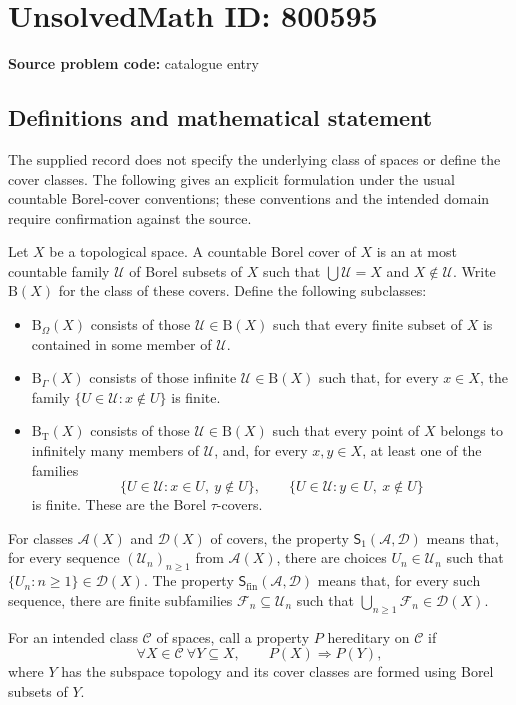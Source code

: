 \documentclass[11pt]{article}
\begin{document}
\section*{UnsolvedMath ID: 800595}
\textbf{Source problem code:} catalogue entry
\subsection{Definitions and mathematical statement}
The supplied record does not specify the underlying class of spaces or define the cover classes. The following gives an explicit formulation under the usual countable Borel-cover conventions; these conventions and the intended domain require confirmation against the source.

Let \(X\) be a topological space. A countable Borel cover of \(X\) is an at most countable family \(\mathcal U\) of Borel subsets of \(X\) such that \(\bigcup\mathcal U=X\) and \(X\notin\mathcal U\). Write \(\mathrm B(X)\) for the class of these covers. Define the following subclasses:
\begin{itemize}
\item \(\mathrm B_\Omega(X)\) consists of those \(\mathcal U\in\mathrm B(X)\) such that every finite subset of \(X\) is contained in some member of \(\mathcal U\).
\item \(\mathrm B_\Gamma(X)\) consists of those infinite \(\mathcal U\in\mathrm B(X)\) such that, for every \(x\in X\), the family \(\{U\in\mathcal U:x\notin U\}\) is finite.
\item \(\mathrm B_{\mathrm T}(X)\) consists of those \(\mathcal U\in\mathrm B(X)\) such that every point of \(X\) belongs to infinitely many members of \(\mathcal U\), and, for every \(x,y\in X\), at least one of the families
\[
\{U\in\mathcal U:x\in U,\ y\notin U\},\qquad
\{U\in\mathcal U:y\in U,\ x\notin U\}
\]
is finite. These are the Borel \(\tau\)-covers.
\end{itemize}
For classes \(\mathcal A(X)\) and \(\mathcal D(X)\) of covers, the property \(\mathsf S_1(\mathcal A,\mathcal D)\) means that, for every sequence \((\mathcal U_n)_{n\geq1}\) from \(\mathcal A(X)\), there are choices \(U_n\in\mathcal U_n\) such that \(\{U_n:n\geq1\}\in\mathcal D(X)\). The property \(\mathsf S_{\mathrm{fin}}(\mathcal A,\mathcal D)\) means that, for every such sequence, there are finite subfamilies \(\mathcal F_n\subseteq\mathcal U_n\) such that \(\bigcup_{n\geq1}\mathcal F_n\in\mathcal D(X)\).

For an intended class \(\mathcal C\) of spaces, call a property \(P\) hereditary on \(\mathcal C\) if
\[
\forall X\in\mathcal C\ \forall Y\subseteq X,
\qquad P(X)\Longrightarrow P(Y),
\]
where \(Y\) has the subspace topology and its cover classes are formed using Borel subsets of \(Y\).
\end{document}
